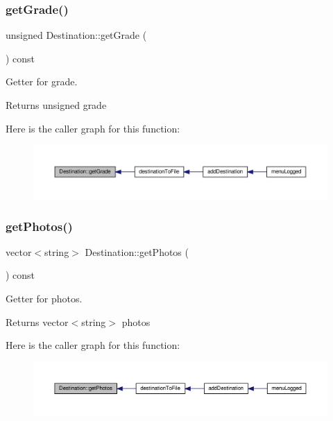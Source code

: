 \subsubsection{\texorpdfstring{get\+Grade()}{getGrade()}}
{\footnotesize\ttfamily unsigned Destination\+::get\+Grade (\begin{DoxyParamCaption}{ }\end{DoxyParamCaption}) const\hspace{0.3cm}{\ttfamily [inline]}}

Getter for grade. \begin{DoxyReturn}{Returns}
unsigned grade 
\end{DoxyReturn}
Here is the caller graph for this function\+:\nopagebreak
\begin{figure}[H]
\begin{center}
\leavevmode
\includegraphics[width=350pt]{class_destination_a34dd7a2072743078d5067d336dc3c25d_icgraph}
\end{center}
\end{figure}
\mbox{\label{class_destination_ade746815624a6fd5add31a3475e04b45}} 
\subsubsection{\texorpdfstring{get\+Photos()}{getPhotos()}}
{\footnotesize\ttfamily vector$<$string$>$ Destination\+::get\+Photos (\begin{DoxyParamCaption}{ }\end{DoxyParamCaption}) const\hspace{0.3cm}{\ttfamily [inline]}}

Getter for photos. \begin{DoxyReturn}{Returns}
vector$<$string$>$ photos 
\end{DoxyReturn}
Here is the caller graph for this function\+:\nopagebreak
\begin{figure}[H]
\begin{center}
\leavevmode
\includegraphics[width=350pt]{class_destination_ade746815624a6fd5add31a3475e04b45_icgraph}
\end{center}
\end{figure}
\mbox{\label{class_destination_a6a98c7e1c0ffa4b821d3f7dd85cad3dd}} 
